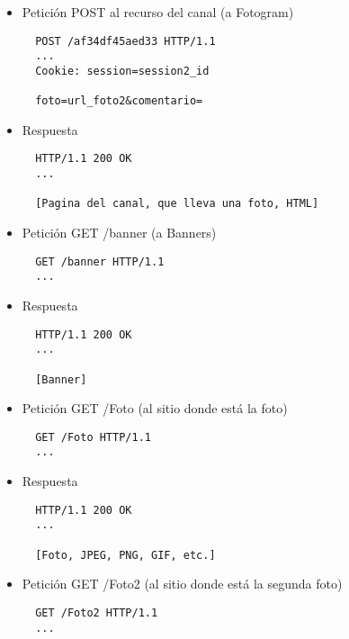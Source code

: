 {\begin{itemize}
\begin{verbatim}
  HTTP/1.1 200 OK
  ...

  [Foto, JPEG, PNG, GIF, etc.]
\end{verbatim}


\item Petición POST al recurso del canal (a Fotogram)

\begin{verbatim}
  POST /af34df45aed33 HTTP/1.1
  ...
  Cookie: session=session2_id

  foto=url_foto2&comentario=
\end{verbatim}

\item Respuesta

\begin{verbatim}
  HTTP/1.1 200 OK
  ...

  [Pagina del canal, que lleva una foto, HTML]
\end{verbatim}

\item Petición GET /banner (a Banners)

\begin{verbatim}
  GET /banner HTTP/1.1
  ...
\end{verbatim}

\item Respuesta

\begin{verbatim}
  HTTP/1.1 200 OK
  ...

  [Banner]
\end{verbatim}

\item Petición GET /Foto (al sitio donde está la foto)

\begin{verbatim}
  GET /Foto HTTP/1.1
  ...
\end{verbatim}

\item Respuesta

\begin{verbatim}
  HTTP/1.1 200 OK
  ...

  [Foto, JPEG, PNG, GIF, etc.]
\end{verbatim}

\item Petición GET /Foto2 (al sitio donde está la segunda foto)

\begin{verbatim}
  GET /Foto2 HTTP/1.1
  ...
\end{verbatim}


\end{itemize}}
